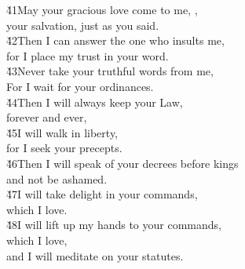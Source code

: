\begin{poetry}
\poeml \v{41}May your gracious love come to me, , \\
\poemll    your salvation, just as you said. \\
\poeml \v{42}Then I can answer the one who insults me, \\
\poemll    for I place my trust in your word. \\
\poeml \v{43}Never take your truthful words from me, \\
\poemll    For I wait for your ordinances. \\
\poeml \v{44}Then I will always keep your Law, \\
\poemll    forever and ever, \\
\poeml \v{45}I will walk in liberty, \\
\poemll    for I seek your precepts. \\
\poeml \v{46}Then I will speak of your decrees before kings \\
\poemll    and not be ashamed. \\
\poeml \v{47}I will take delight in your commands, \\
\poemll    which I love. \\
\poeml \v{48}I will lift up my hands to your commands, \\
\poemll    which I love, \\
\poemlll       and I will meditate on your statutes.
\end{poetry}

